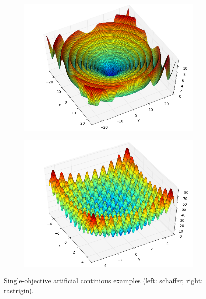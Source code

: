 \documentclass[12pt, runningheads,a4paper]{llncs}
\begin{document}
\begin{figure}
        \centering
        \begin{subfigure}[b]{0.4\textwidth}
                \centering
                \includegraphics[width=\textwidth]{./figs/schaffer.png}
        \end{subfigure}
        \begin{subfigure}[b]{0.4\textwidth}
                \centering
                \includegraphics[width=\textwidth]{./figs/rastrigin.png}
        \end{subfigure}
        \caption{Single-objective artificial continious examples (left: schaffer; right: rastrigin).}\label{fig:fitexample}
\end{figure}
\end{document}
